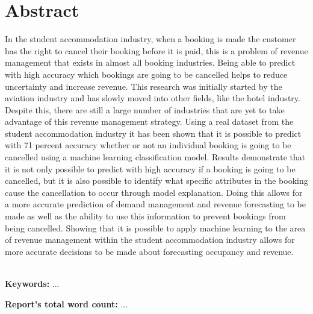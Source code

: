 \chapter*{\center \Large  Abstract}

In the student accommodation industry, when a booking is made the customer has the right to cancel their booking before it is paid, this is a problem of revenue management that exists in almost all booking industries. Being able to predict with high accuracy which bookings are going to be cancelled helps to reduce uncertainty and increase revenue. This research was initially started by the aviation industry and has slowly moved into other fields, like the hotel industry. Despite this, there are still a large number of industries that are yet to take advantage of this revenue management strategy. Using a real dataset from the student accommodation industry it has been shown that it is possible to predict with 71 percent accuracy whether or not an individual booking is going to be cancelled using a machine learning classification model. Results demonstrate that it is not only possible to predict with high accuracy if a booking is going to be cancelled, but it is also possible to identify what specific attributes in the booking cause the cancellation to occur through model explanation. Doing this allows for a more accurate prediction of demand management and revenue forecasting to be made as well as the ability to use this information to prevent bookings from being cancelled. Showing that it is possible to apply machine learning to the area of revenue management within the student accommodation industry allows for more accurate decisions to be made about forecasting occupancy and revenue.

~\\[1cm]
\noindent
\textbf{Keywords:} ...

\vfill
\noindent
\textbf{Report's total word count:} ...

